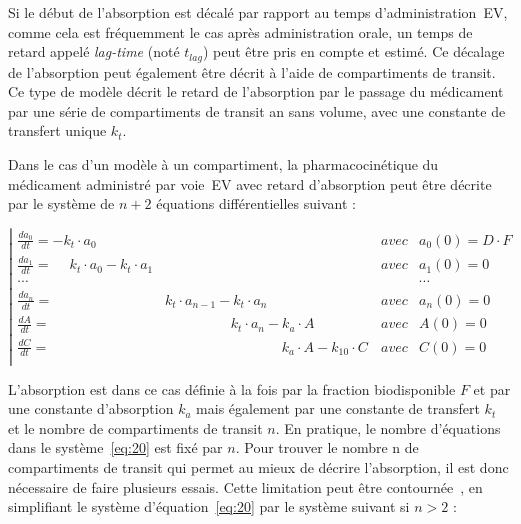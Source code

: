 Si le début de l'absorption est décalé par rapport au temps d'administration~\gls{EV}, comme cela est fréquemment le cas après administration orale, un temps de retard appelé \textit{lag-time} (noté $t_{lag}$) peut être pris en compte et estimé. Ce décalage de l'absorption peut également être décrit à l'aide de compartiments de transit. Ce type de modèle décrit le retard de l'absorption par le passage du médicament par une série de compartiments de transit an sans volume, avec une constante de transfert unique $k_t$.

Dans le cas d'un modèle à un compartiment, la pharmacocinétique du médicament administré par voie~\gls{EV} avec retard d'absorption peut être décrite par le système de $n+2$ équations différentielles suivant :

\begin{equation}
\left| \begin{matrix}
\frac{da_0}{dt}=-k_{t}\cdot a_0 \phantom{-k_{t}\cdot a_1 -k_{t}\cdot a_{n-1} -k_{t}\cdot a_n -k_a\cdot A -k_{10}\cdot C  }         & avec & a_0(0)=D \cdot F\\ 
\frac{da_1}{dt}=\phantom{-}k_{t}\cdot a_0 -k_{t}\cdot a_1 \phantom{-k_{t}\cdot a_{n-1} -k_{t}\cdot a_n -k_a\cdot A -k_{10}\cdot C} & avec & a_1(0)=0\\
\cdots                                                                                                                             &      & \cdots \\
\frac{da_n}{dt}=\phantom{-k_{t}\cdot a_0 -k_{t}\cdot a_1 -}k_{t}\cdot a_{n-1} -k_{t}\cdot a_n \phantom{-k_a\cdot A -k_{10}\cdot C} & avec & a_n(0)=0\\ 
\frac{dA}{dt}  =\phantom{-k_{t}\cdot a_0 -k_{t}\cdot a_1 -k_{t}\cdot a_{n-1} -}k_{t}\cdot a_n -k_a\cdot A \phantom{-k_{10}\cdot C} & avec & A(0)=0\\ 
\frac{dC}{dt}  =\phantom{-k_{t}\cdot a_0 -k_{t}\cdot a_1 -k_{t}\cdot a_{n-1} -k_{t}\cdot a_n -}k_a\cdot A -k_{10}\cdot C           & avec & C(0)=0\\ 
\end{matrix}\right.
\label{eq:20}
\end{equation}

L'absorption est dans ce cas définie à la fois par la fraction biodisponible $F$ et par une constante d'absorption $k_{a}$ mais également par une constante de transfert $k_t$ et le nombre de compartiments de transit $n$. En pratique, le nombre d'équations dans le système~\ref{eq:20} est fixé par $n$. Pour trouver le nombre n de compartiments de transit qui permet au mieux de décrire l'absorption, il est donc nécessaire de faire plusieurs essais. Cette limitation peut être contournée~\citep{REF1}, en simplifiant le système d'équation~\ref{eq:20} par le système suivant si $n > 2$ :

